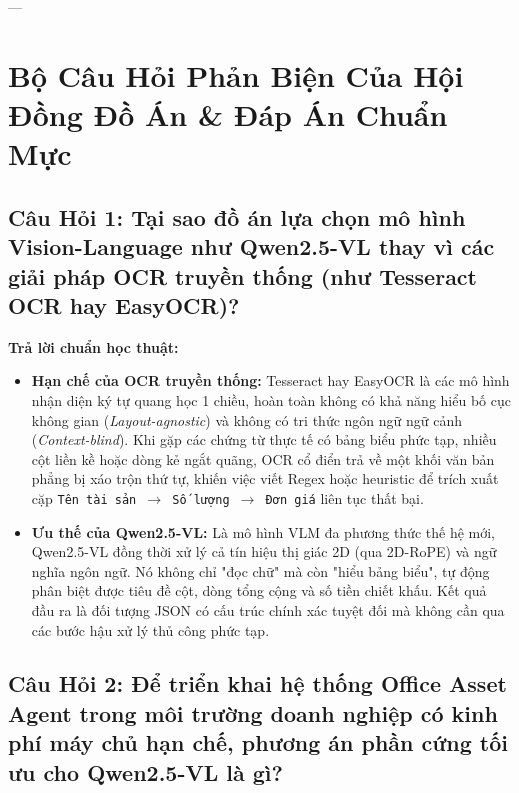\documentclass[11pt,a4paper]{article}
\begin{document}
---

\section{Bộ Câu Hỏi Phản Biện Của Hội Đồng Đồ Án \& Đáp Án Chuẩn Mực}

\subsection{Câu Hỏi 1: Tại sao đồ án lựa chọn mô hình Vision-Language như Qwen2.5-VL thay vì các giải pháp OCR truyền thống (như Tesseract OCR hay EasyOCR)?}

\textbf{Trả lời chuẩn học thuật:}
\begin{itemize}[leftmargin=1.5em]
    \item \textbf{Hạn chế của OCR truyền thống:} Tesseract hay EasyOCR là các mô hình nhận diện ký tự quang học 1 chiều, hoàn toàn không có khả năng hiểu bố cục không gian (\textit{Layout-agnostic}) và không có tri thức ngôn ngữ ngữ cảnh (\textit{Context-blind}). Khi gặp các chứng từ thực tế có bảng biểu phức tạp, nhiều cột liền kề hoặc dòng kẻ ngắt quãng, OCR cổ điển trả về một khối văn bản phẳng bị xáo trộn thứ tự, khiến việc viết Regex hoặc heuristic để trích xuất cặp \texttt{Tên tài sản $\rightarrow$ Số lượng $\rightarrow$ Đơn giá} liên tục thất bại.
    \item \textbf{Ưu thế của Qwen2.5-VL:} Là mô hình VLM đa phương thức thế hệ mới, Qwen2.5-VL đồng thời xử lý cả tín hiệu thị giác 2D (qua 2D-RoPE) và ngữ nghĩa ngôn ngữ. Nó không chỉ "đọc chữ" mà còn "hiểu bảng biểu", tự động phân biệt được tiêu đề cột, dòng tổng cộng và số tiền chiết khấu. Kết quả đầu ra là đối tượng JSON có cấu trúc chính xác tuyệt đối mà không cần qua các bước hậu xử lý thủ công phức tạp.
\end{itemize}

\subsection{Câu Hỏi 2: Để triển khai hệ thống Office Asset Agent trong môi trường doanh nghiệp có kinh phí máy chủ hạn chế, phương án phần cứng tối ưu cho Qwen2.5-VL là gì?}
\end{document}
